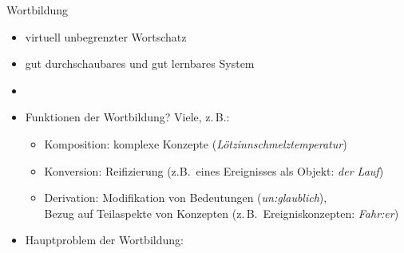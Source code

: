 \begin{frame}
  {Wortbildung}
  \pause
  \begin{itemize}[<+->]
    \item virtuell unbegrenzter Wortschatz
      \Zeile
    \item gut durchschaubares und \alert{gut lernbares} System
    \item {}
      \Zeile
    \item Funktionen der Wortbildung? Viele, z.\,B.:
      \begin{itemize}
        \item Komposition: \alert{komplexe Konzepte} (\textit{Lötzinnschmelztemperatur})
        \item Konversion: \alert{Reifizierung} (z.B.\ eines Ereignisses als Objekt: \textit{der Lauf})
        \item Derivation: \alert{Modifikation von Bedeutungen} (\textit{un:glaublich}),\\
          \alert{Bezug auf Teilaspekte von Konzepten} (z.\,B.\ Ereigniskonzepten: \textit{Fahr:er})
      \end{itemize}
      \Halbzeile
    \item Hauptproblem der Wortbildung:\\
  \end{itemize}
\end{frame}

